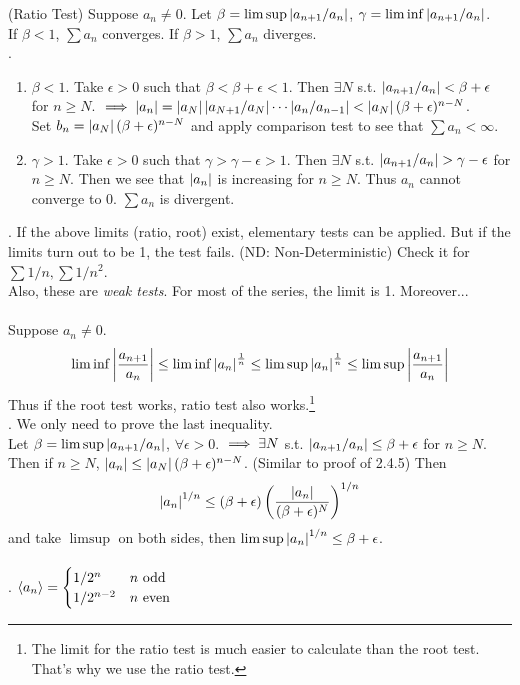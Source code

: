  (Ratio Test) Suppose $a_n \neq 0$. Let $\beta = \limsup \left|a_{n+1}/a_n\right|$, $\gamma = \liminf \left|a_{n+1}/a_n\right|$.\\
If $\beta < 1$, $\sum a_n$ converges. If $\beta > 1$, $\sum a_n$ diverges.\\
\pf.
\begin{enumerate}
	\item $\beta < 1$. Take $\epsilon>0$ such that $\beta < \beta + \epsilon < 1$. Then $\exists N$ s.t. $\left|a_{n+1}/a_n\right| < \beta + \epsilon$ for $n\geq N$. $\implies \left|a_n\right| = \left|a_N\right| \left|a_{N+1}/a_N\right| \cdots \left|a_n/a_{n-1}\right| < \left|a_N\right|(\beta+\epsilon)^{n-N}$.\\
	Set $b_n = \left|a_N\right|(\beta + \epsilon)^{n-N}$ and apply comparison test to see that $\sum a_n < \infty$.
	\item $\gamma > 1$. Take $\epsilon > 0$ such that $\gamma > \gamma - \epsilon > 1$. Then $\exists N$ s.t. $\left|a_{n+1}/a_n\right| > \gamma - \epsilon$ for $n\geq N$. Then we see that $\left|a_n\right|$ is increasing for $n\geq N$. Thus $a_n$ cannot converge to 0. $\sum a_n$ is divergent.
\end{enumerate}
\rmk. If the above limits (ratio, root) exist, elementary tests can be applied. But if the limits turn out to be 1, the test fails. (ND: Non-Deterministic) Check it for $\sum 1/n, \sum 1/n^2$.\\
Also, these are \textit{weak tests}. For most of the series, the limit is 1. Moreover...\\
\\
 Suppose $a_n \neq 0$. $$\liminf \left|\frac{a_{n+1}}{a_n}\right| \leq \liminf \left|a_n\right|^{\frac{1}{n}} \leq \limsup \left|a_n\right|^{\frac{1}{n}}  \leq \limsup \left|\frac{a_{n+1}}{a_n}\right|$$ Thus if the root test works, ratio test also works.\footnote{The limit for the ratio test is much easier to calculate than the root test. That's why we use the ratio test.}\\
\pf. We only need to prove the last inequality.\\
Let $\beta =  \limsup\left|a_{n+1}/a_n\right| $, $\forall \epsilon > 0$. $\implies\exists N$ s.t. $\left|a_{n+1}/a_n\right| \leq \beta + \epsilon$ for $n\geq N$. Then if $n\geq N$, $\left|a_n\right| \leq \left|a_N\right|(\beta+\epsilon)^{n-N}$. (Similar to proof of 2.4.5) Then $$\left|a_n\right|^{1/n} \leq (\beta + \epsilon) \left(\frac{\left|a_n\right|}{(\beta +\epsilon)^N}\right)^{1/n}$$ and take $\limsup$ on both sides, then $\limsup \left|a_n\right|^{1/n} \leq \beta + \epsilon$.\\
\\
\ex. $\left\langle a_n \right\rangle = \begin{cases}
	1/2^{n} & n \text{ odd}\\
	1/2^{n-2} & n \text{ even}
\end{cases}$\\
